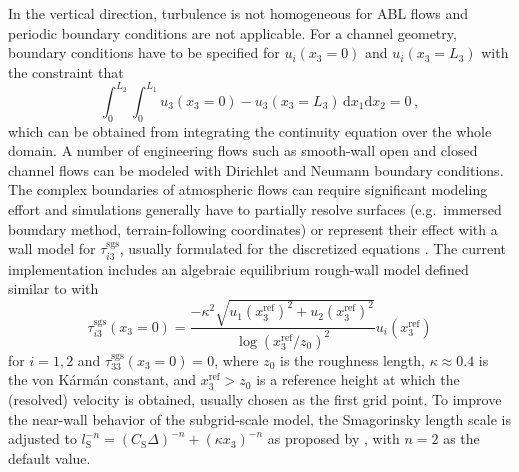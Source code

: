 \documentclass[gmd, manuscript]{copernicus}
\begin{document}
In the vertical direction, turbulence is not homogeneous for ABL flows and periodic boundary conditions are not applicable.
For a channel geometry, boundary conditions have to be specified for \(u_i(x_3 = 0)\) and \(u_i(x_3 = L_3)\) with the constraint that
\begin{equation}
  \int_0^{L_2} \int_0^{L_1} u_3(x_3=0) - u_3(x_3=L_3) \, \mathrm{d}{x_1} \mathrm{d}{x_2} = 0\,,
\end{equation}
which can be obtained from integrating the continuity equation over the whole domain.
A number of engineering flows such as smooth-wall open and closed channel flows can be modeled with Dirichlet and Neumann boundary conditions.
The complex boundaries of atmospheric flows can require significant modeling effort and simulations generally have to partially resolve surfaces (e.g.~immersed boundary method, terrain-following coordinates) or represent their effect with a wall model for \(\tau_{i3}^\mathrm{sgs}\), usually formulated for the discretized equations \citep{PiomelliBalaras2002}.
The current implementation includes an algebraic equilibrium rough-wall model defined similar to \citet{MasonCallen1986} with
\begin{equation}
  \tau_{i3}^\mathrm{sgs}(x_3=0) =
  \frac{-\kappa^2 \sqrt{u_1(x_3^\mathrm{ref})^2 + u_2(x_3^\mathrm{ref})^2}}
  {\log(x_3^\mathrm{ref} / z_0)^2} u_i(x_3^\mathrm{ref})
\end{equation}
for \(i=1,2\) and \(\tau_{33}^\mathrm{sgs}(x_3=0) = 0\), where \(z_0\) is the roughness length, \(\kappa \approx 0.4\) is the von Kármán constant, and \(x_3^\mathrm{ref} > z_0\) is a reference height at which the (resolved) velocity is obtained, usually chosen as the first grid point.
To improve the near-wall behavior of the subgrid-scale model, the Smagorinsky length scale is adjusted to \(l_\mathrm{S}^{-n} = \left(C_\mathrm{S} \Delta\right)^{-n} + \left(\kappa x_3 \right)^{-n}\) as proposed by \citet{MasonThomson1992}, with \(n=2\) as the default value.
\end{document}
